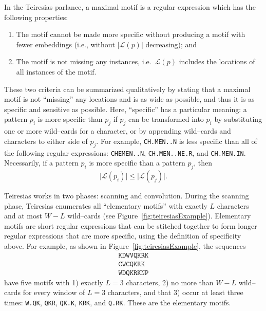     In the Teiresias parlance, a maximal motif is a regular expression which has the following properties:
        \begin{enumerate}
        \item   The motif cannot be made more specific
            without producing a motif with
            fewer embeddings (i.e., without
            $\vert \mathscr{L}(p) \vert$
            decreasing); and

        \item   The motif is not missing any instances,
            i.e.\ $\mathscr{L}(p)$ includes the locations
            of all instances of the motif.

        \end{enumerate}
    These two criteria can be summarized qualitatively by stating that a maximal
    motif is not ``missing'' any locations and is as wide as possible, and
    thus it is as specific and sensitive as possible.  Here,
    ``specific'' has a particular meaning: a pattern $p_i$ is more
    specific than $p_j$ if $p_j$ can be transformed into $p_i$ by
    substituting one or more wild--cards for a character, or by
    appending wild--cards and characters to either side of $p_j$.
    For example, \texttt{CH.MEN..N} is less specific than all of the
    following regular expressions: \texttt{CHEMEN..N},
    \texttt{CH.MEN..NE.R},
    and \texttt{CH.MEN.IN}.
    Necessarily, if a pattern $p_i$ is more specific than a pattern $p_j$, then
    \begin{equation}\label{eqn:support}
        \vert \mathscr{L}(p_i) \vert \leq
        \vert \mathscr{L}(p_j) \vert .
    \end{equation}

    Teiresias works in two phases: scanning and convolution.
    During the scanning phase, Teiresias enumerates
    all ``elementary motifs'' with exactly $L$ characters and at most $W-L$
    wild--cards (see Figure~\vref{fig:teiresiasExample}).
    Elementary motifs are short regular expressions that can be
    stitched together to form longer regular expressions that are
    more specific, using the definition of specificity above.  For
    example, as shown in Figure~\ref{fig:teiresiasExample}, the
    sequences
    \begin{equation*}
        \begin{split}
          \texttt{KDWVQKRK} \\
          \texttt{CWCQKRK} \\
          \texttt{WDQKRKNP}
        \end{split}
    \end{equation*}
    have five motifs with 1) exactly $L=3$ characters, 2) no more than
    $W-L$ wild--cards for every window of $L=3$ characters,
    and that 3) occur at least three times:
    \texttt{W.QK}, \texttt{QKR}, \texttt{QK.K}, \texttt{KRK},
    and \texttt{Q.RK}.  These are the elementary motifs.

